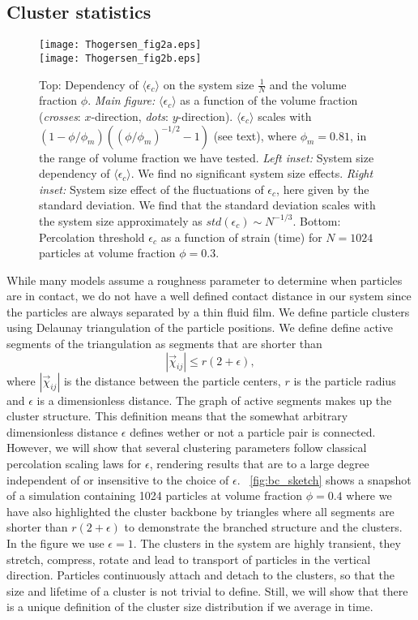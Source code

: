 \documentclass[aps,pre,twocolumn,letterpaper,floatfix,showpacs]{revtex4}
\begin{document}
\subsection{Cluster statistics}
\begin{figure}
\texttt{[image: Thogersen\_fig2a.eps]}\\
\texttt{[image: Thogersen\_fig2b.eps]}
\caption{Top: Dependency of $\langle \epsilon_c \rangle$ on the system size $\frac{1}{N}$ and the volume fraction $\phi$. 
\emph{Main figure:} $\langle \epsilon_c \rangle$ as a function of the volume fraction (\emph{crosses}: $x$-direction, \emph{dots}: $y$-direction). $\langle\epsilon_c\rangle$ scales with $(1-\phi/\phi_m) \left ( (\phi/\phi_m)^{-1/2} - 1 \right )$ (see text), where $\phi_m = 0.81$, in the range of volume fraction we have tested. \emph{Left inset:} System size dependency of $\langle \epsilon_c\rangle$. We find no significant system size effects. \emph{Right inset:} System size effect of the fluctuations of $\epsilon_c$, here given by the standard deviation. We find that the standard deviation scales with the system size approximately as $std(\epsilon_c) \sim N^{-1/3}$.
Bottom: Percolation threshold $\epsilon_c$ as a function of strain (time) for $N=1024$ particles at volume fraction $\phi = 0.3$.
\label{fig:epsilon_c_scaling}}
\end{figure}

While many models assume a roughness parameter to determine when particles are in contact, we do not have a well defined contact distance in our system since the particles are always separated by a thin fluid film.  We define particle clusters using Delaunay triangulation of the particle positions. We define define active segments of the triangulation as segments that are shorter than
\begin{equation}
|\vec \chi_{ij}| \leq r(2+\epsilon),
\end{equation}
where $|\vec \chi_{ij}|$ is the distance between the particle centers, $r$ is the particle radius and $\epsilon$ is a dimensionless distance. The graph of active segments makes up the cluster structure. This definition means that the somewhat arbitrary dimensionless distance $\epsilon$ defines wether or not a particle pair is connected. However, we will show that several clustering parameters follow classical percolation scaling laws for $\epsilon$, rendering results that are to a large degree independent of or insensitive to the choice of $\epsilon$. \figurename~\ref{fig:bc_sketch} shows a snapshot of a simulation containing 1024 particles at volume fraction $\phi = 0.4$ where we have also highlighted the cluster backbone by triangles where all segments are shorter than $r(2+\epsilon)$ to demonstrate the branched structure and the clusters. In the figure we use $\epsilon = 1$. The clusters in the system are highly transient, they stretch, compress, rotate and lead to transport of particles in the vertical direction. Particles continuously attach and detach to the clusters, so that the size and lifetime of a cluster is not trivial to define. Still, we will show that there is a unique definition of the cluster size distribution if we average in time.
\end{document}
